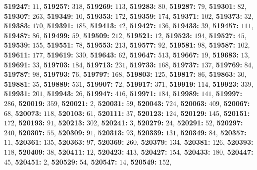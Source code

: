 \textsf{\bfseries 519247:} $11$, \textsf{\bfseries 519257:} $318$, \textsf{\bfseries 519269:} $113$, \textsf{\bfseries 519283:} $80$, \textsf{\bfseries 519287:} $79$, \textsf{\bfseries 519301:} $82$, \textsf{\bfseries 519307:} $263$, \textsf{\bfseries 519349:} $10$, \textsf{\bfseries 519353:} $172$, \textsf{\bfseries 519359:} $174$, \textsf{\bfseries 519371:} $102$, \textsf{\bfseries 519373:} $32$, \textsf{\bfseries 519383:} $170$, \textsf{\bfseries 519391:} $185$, \textsf{\bfseries 519413:} $42$, \textsf{\bfseries 519427:} $136$, \textsf{\bfseries 519433:} $39$, \textsf{\bfseries 519457:} $111$, \textsf{\bfseries 519487:} $86$, \textsf{\bfseries 519499:} $59$, \textsf{\bfseries 519509:} $212$, \textsf{\bfseries 519521:} $12$, \textsf{\bfseries 519523:} $194$, \textsf{\bfseries 519527:} $45$, \textsf{\bfseries 519539:} $155$, \textsf{\bfseries 519551:} $78$, \textsf{\bfseries 519553:} $213$, \textsf{\bfseries 519577:} $92$, \textsf{\bfseries 519581:} $98$, \textsf{\bfseries 519587:} $102$, \textsf{\bfseries 519611:} $177$, \textsf{\bfseries 519619:} $330$, \textsf{\bfseries 519643:} $62$, \textsf{\bfseries 519647:} $513$, \textsf{\bfseries 519667:} $19$, \textsf{\bfseries 519683:} $13$, \textsf{\bfseries 519691:} $33$, \textsf{\bfseries 519703:} $184$, \textsf{\bfseries 519713:} $231$, \textsf{\bfseries 519733:} $168$, \textsf{\bfseries 519737:} $137$, \textsf{\bfseries 519769:} $84$, \textsf{\bfseries 519787:} $98$, \textsf{\bfseries 519793:} $76$, \textsf{\bfseries 519797:} $168$, \textsf{\bfseries 519803:} $125$, \textsf{\bfseries 519817:} $86$, \textsf{\bfseries 519863:} $30$, \textsf{\bfseries 519881:} $35$, \textsf{\bfseries 519889:} $531$, \textsf{\bfseries 519907:} $72$, \textsf{\bfseries 519917:} $371$, \textsf{\bfseries 519919:} $114$, \textsf{\bfseries 519923:} $339$, \textsf{\bfseries 519931:} $201$, \textsf{\bfseries 519943:} $26$, \textsf{\bfseries 519947:} $416$, \textsf{\bfseries 519971:} $184$, \textsf{\bfseries 519989:} $141$, \textsf{\bfseries 519997:} $286$, \textsf{\bfseries 520019:} $359$, \textsf{\bfseries 520021:} $2$, \textsf{\bfseries 520031:} $59$, \textsf{\bfseries 520043:} $724$, \textsf{\bfseries 520063:} $409$, \textsf{\bfseries 520067:} $68$, \textsf{\bfseries 520073:} $118$, \textsf{\bfseries 520103:} $61$, \textsf{\bfseries 520111:} $37$, \textsf{\bfseries 520123:} $124$, \textsf{\bfseries 520129:} $145$, \textsf{\bfseries 520151:} $172$, \textsf{\bfseries 520193:} $91$, \textsf{\bfseries 520213:} $302$, \textsf{\bfseries 520241:} $3$, \textsf{\bfseries 520279:} $24$, \textsf{\bfseries 520291:} $52$, \textsf{\bfseries 520297:} $240$, \textsf{\bfseries 520307:} $55$, \textsf{\bfseries 520309:} $91$, \textsf{\bfseries 520313:} $93$, \textsf{\bfseries 520339:} $131$, \textsf{\bfseries 520349:} $84$, \textsf{\bfseries 520357:} $11$, \textsf{\bfseries 520361:} $135$, \textsf{\bfseries 520363:} $97$, \textsf{\bfseries 520369:} $260$, \textsf{\bfseries 520379:} $134$, \textsf{\bfseries 520381:} $126$, \textsf{\bfseries 520393:} $118$, \textsf{\bfseries 520409:} $38$, \textsf{\bfseries 520411:} $12$, \textsf{\bfseries 520423:} $413$, \textsf{\bfseries 520427:} $154$, \textsf{\bfseries 520433:} $180$, \textsf{\bfseries 520447:} $45$, \textsf{\bfseries 520451:} $2$, \textsf{\bfseries 520529:} $54$, \textsf{\bfseries 520547:} $14$, \textsf{\bfseries 520549:} $152$, 

